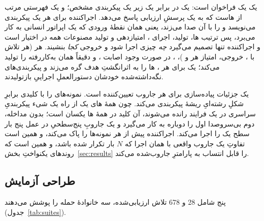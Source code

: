 یک \emph{} یک فراخوان  است: یک  در برابر یک
 زیر یک پیکربندی مشخص؛ و یک \emph{} فهرستی
مرتب از ‌هاست که به یک پرسشِ ارزیابی پاسخ می‌دهد. اجراکننده برای
هر  یک پیکربندی  می‌نویسد و 
را با آن صدا می‌زند، یعنی همان نقطهٔ ورودی که یک اپراتور انسانی به کار
می‌برد، پس ترتیب ‌ها، تولید، اجرای ، امتیازدهی و
تولید مصنوعات همه در اختیار  است و اجراکننده تنها تصمیم می‌گیرد
\emph{چه} چیزی اجرا شود و خروجی \emph{کجا} بنشیند. هر 
 (هر تلاش با ، خروجی، امتیاز هر
 و )، ، در صورت وجود اصابت
، و دقیقاً همان  به‌کاررفته را تولید
می‌کند؛ یک  برای هر ، ‌ها را به اثرانگشتِ
هدف گره می‌زند و پیکربندی‌های نگه‌داشته‌شده خودشان دستورالعملِ اجراییِ
بازتولیدند.

یک جزئیات پیاده‌سازی برای هر جاروب تعیین‌کننده است.  نمونه‌های
 را با کلیدی برابرِ شکلِ رشته‌ایِ ریشهٔ پیکربندی 
می‌کند. چون همهٔ ‌های یک  از راه یک شیء پیکربندیِ
سراسری در یک فرایند رانده می‌شوند، آن کلید در همهٔ ‌ها یکسان
است؛ بدون مداخله،  دوم بی‌سروصدا   اول را
دوباره به کار می‌گیرد و یک جاروبِ پنج‌سطحیِ  در عمل پنج بار
سطح یک را اجرا می‌کند. اجراکننده پیش از هر   نمونه‌ها
را پاک می‌کند، و همین است تفاوتِ یک جاروب واقعی با همان اجرا که $N$ بار
تکرار شده باشد، و همین است که روندهای یکنواختِ بخش~\ref{sec:results} را
قابل انتساب به پارامترِ جاروب‌شده می‌کند.

\subsection{طراحی آزمایش}
\label{sec:method:design}

پنج  شامل \num{28}  و \num{678} تلاش ارزیابی‌شده، سه
خانوادهٔ حمله را پوشش می‌دهند (جدول~\ref{tab:suites}).

